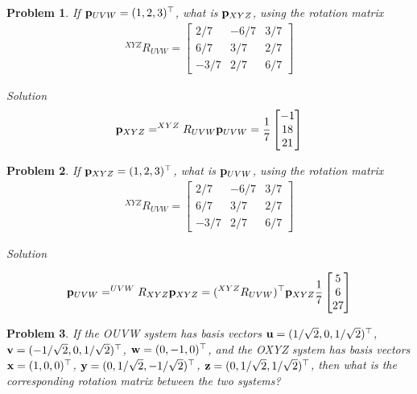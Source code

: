 \documentclass{article}
\newtheorem{prob}{Problem}
\numberwithin{prob}{section}
\newenvironment{solution}{\emph{Solution}}{}
\begin{document}
\begin{prob}
  If $\mathbf{p}_{UVW} = (1, 2, 3)^\top$, what is $\mathbf{p}_{XYZ}$,
  using the rotation matrix
  \begin{align}
  ^{XYZ}R_{UVW} = \begin{bmatrix}
    2/7 & -6/7 & 3/7\\
   6/7 & 3/7 & 2/7\\
   -3/7 & 2/7 & 6/7
  \end{bmatrix}
\end{align}
\end{prob}
\begin{solution}
\begin{align}
  \mathbf{p}_{XYZ} = ^{XYZ}R_{UVW} \mathbf{p}_{UVW} = \frac{1}{7}\begin{bmatrix} -1 \\ 18 \\ 21\end{bmatrix}
\end{align}

\end{solution}
\begin{prob}
  If $\mathbf{p}_{XYZ} = (1, 2, 3)^\top$, what is $\mathbf{p}_{UVW}$,
  using the rotation matrix
  \begin{align}
  ^{XYZ}R_{UVW} = \begin{bmatrix}
    2/7 & -6/7 & 3/7\\
   6/7 & 3/7 & 2/7\\
   -3/7 & 2/7 & 6/7
  \end{bmatrix}
\end{align}
\end{prob}
\begin{solution}

\begin{align}
  \mathbf{p}_{UVW} = ^{UVW}R_{XYZ} \mathbf{p}_{XYZ} = (^{XYZ}R_{UVW})^\top \mathbf{p}_{XYZ}
  \frac{1}{7}\begin{bmatrix} 5 \\ 6 \\ 27 \end{bmatrix}
\end{align}

\end{solution}

\begin{prob}
If the OUVW system has basis vectors $\mathbf{u} = (1/\sqrt2, 0, 1/\sqrt2)^\top$, $\mathbf{v} = (-1/\sqrt2, 0, 1/\sqrt2)^\top$, $\mathbf{w} = (0, -1, 0)^\top$, and the OXYZ system has basis vectors $\mathbf{x} = (1, 0, 0)^\top$, $\mathbf{y} = (0, 1/\sqrt2, -1/\sqrt2)^\top$, $\mathbf{z} = (0, 1/\sqrt2, 1/\sqrt2)^\top$, then what is the corresponding rotation matrix between the two systems? 
\end{prob}
\end{document}
